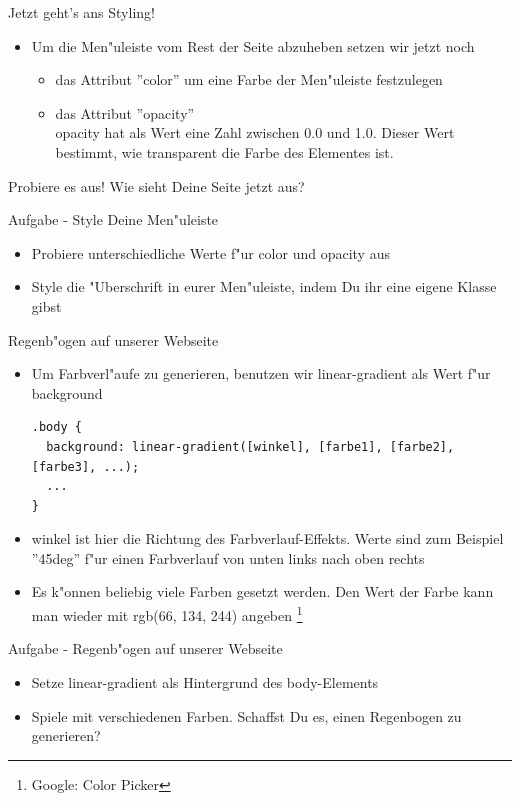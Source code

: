 \documentclass[18pt]{beamer}
\begin{document}
\begin{frame}[fragile]{Jetzt geht's ans Styling!}
\begin{itemize}
\item Um die Men"uleiste vom Rest der Seite abzuheben setzen wir jetzt noch
\begin{itemize}
\item das Attribut ''color'' um eine Farbe der Men"uleiste festzulegen
\item das Attribut ''opacity'' \\
opacity hat als Wert eine Zahl zwischen 0.0  und 1.0. Dieser Wert bestimmt, wie transparent die Farbe des Elementes ist. 
\end{itemize}
\end{itemize}
\pause
Probiere es aus! Wie sieht Deine Seite jetzt aus?
\end{frame}

\begin{frame}[fragile]{Aufgabe - Style Deine Men"uleiste}
\begin{itemize}
\item Probiere unterschiedliche Werte f"ur color und opacity aus
\item Style die "Uberschrift in eurer Men"uleiste, indem Du ihr eine eigene Klasse gibst
\end{itemize}
\end{frame}

\begin{frame}[fragile]{Regenb"ogen auf unserer Webseite}
\begin{itemize}
\item Um Farbverl"aufe zu generieren, benutzen wir linear-gradient als Wert f"ur background
\begin{lstlisting}
.body {
  background: linear-gradient([winkel], [farbe1], [farbe2], [farbe3], ...);
  ...
} 
\end{lstlisting}
\item winkel ist hier die Richtung des Farbverlauf-Effekts. Werte sind zum Beispiel ''45deg'' f"ur einen Farbverlauf von unten links nach oben rechts
\item Es k"onnen beliebig viele Farben gesetzt werden. Den Wert der Farbe kann man wieder mit rgb(66, 134, 244) angeben \footnote{Google: Color Picker}
\end{itemize}
\end{frame}

\begin{frame}[fragile]{Aufgabe - Regenb"ogen auf unserer Webseite}
\begin{itemize}
\item Setze linear-gradient als Hintergrund des body-Elements
\item Spiele mit verschiedenen Farben. Schaffst Du es, einen Regenbogen zu generieren?
\end{itemize}
\end{frame}
\end{document}
